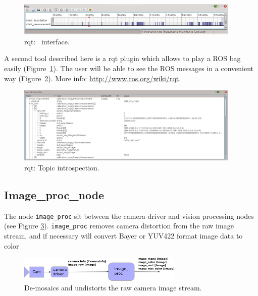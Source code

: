 \begin{figure}[!htbp]
 \centering
 \includegraphics[width=0.95\textwidth]{images/screenshots/rosbag01.png}
 \caption{rqt: \rosbag~interface.}
 \label{fig:rosbag01}
\end{figure}

A second tool described here is a rqt plugin which allows to play a ROS bag easily (Figure~\ref{fig:rosbag01}). The user will be able to see the ROS messages in a convenient way (Figure~\ref{fig:rosbag02}). More info: \url{http://www.ros.org/wiki/rqt}.

\begin{figure}[!htbp]
 \centering
 \includegraphics[width=0.95\textwidth]{images/screenshots/rosbag02.png}
 \caption{rqt: Topic introspection.}
 \label{fig:rosbag02}
\end{figure}

\subsection{Image\_proc\_node}

The node \texttt{image\_proc} sit between the camera driver and vision processing nodes (see Figure \ref{fig:img_proc02}). \texttt{image\_proc} removes camera distortion from the raw image stream, and if necessary will convert Bayer or YUV422 format image data to color

\begin{figure}[!htbp]
 \centering
 \includegraphics[width=0.7\textwidth]{images/img_proc02.png}
 \caption{De-mosaics and undistorts the raw camera image stream.}
 \label{fig:img_proc02}
\end{figure}

